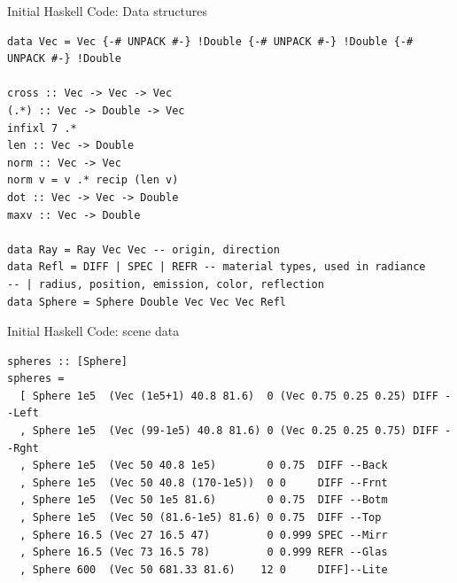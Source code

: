 \documentclass[8pt]{beamer}
\begin{document}
\begin{frame}[fragile]{Initial Haskell Code: Data structures}
\begin{verbatim}
data Vec = Vec {-# UNPACK #-} !Double {-# UNPACK #-} !Double {-# UNPACK #-} !Double

cross :: Vec -> Vec -> Vec
(.*) :: Vec -> Double -> Vec
infixl 7 .*
len :: Vec -> Double
norm :: Vec -> Vec
norm v = v .* recip (len v)
dot :: Vec -> Vec -> Double
maxv :: Vec -> Double

data Ray = Ray Vec Vec -- origin, direction
data Refl = DIFF | SPEC | REFR -- material types, used in radiance
-- | radius, position, emission, color, reflection
data Sphere = Sphere Double Vec Vec Vec Refl
\end{verbatim}

\end{frame}

\begin{frame}[fragile]{Initial Haskell Code: scene data}
\begin{verbatim}
spheres :: [Sphere]
spheres =
  [ Sphere 1e5  (Vec (1e5+1) 40.8 81.6)  0 (Vec 0.75 0.25 0.25) DIFF --Left
  , Sphere 1e5  (Vec (99-1e5) 40.8 81.6) 0 (Vec 0.25 0.25 0.75) DIFF --Rght
  , Sphere 1e5  (Vec 50 40.8 1e5)        0 0.75  DIFF --Back
  , Sphere 1e5  (Vec 50 40.8 (170-1e5))  0 0     DIFF --Frnt
  , Sphere 1e5  (Vec 50 1e5 81.6)        0 0.75  DIFF --Botm
  , Sphere 1e5  (Vec 50 (81.6-1e5) 81.6) 0 0.75  DIFF --Top
  , Sphere 16.5 (Vec 27 16.5 47)         0 0.999 SPEC --Mirr
  , Sphere 16.5 (Vec 73 16.5 78)         0 0.999 REFR --Glas
  , Sphere 600  (Vec 50 681.33 81.6)    12 0     DIFF]--Lite
\end{verbatim}

\end{frame}
\end{document}
